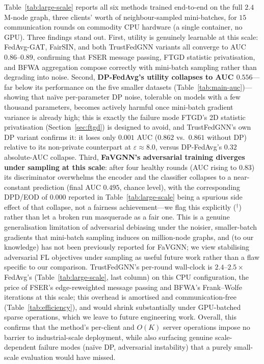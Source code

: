\documentclass[pdflatex,sn-mathphys-num]{sn-jnl}
\theoremstyle{thmstyleone}%
\theoremstyle{thmstyletwo}%
\theoremstyle{thmstylethree}%
\begin{document}
Table~\ref{tab:large-scale} reports all six methods trained end-to-end on the
full $2.4$M-node graph, three clients' worth of neighbour-sampled mini-batches,
for $15$ communication rounds on commodity CPU hardware (a single
container, no GPU). Three findings stand out. First, utility is genuinely
learnable at this scale: FedAvg-GAT, FairSIN, and both TrustFedGNN variants all
converge to AUC $0.86$--$0.89$, confirming that FSER message passing, FTGD
statistic privatisation, and BFWA aggregation compose correctly with
mini-batch sampling rather than degrading into noise. Second,
\textbf{DP-FedAvg's utility collapses to AUC $0.556$}---far below its
performance on the five smaller datasets (Table~\ref{tab:main-auc})---showing
that naïve per-parameter DP noise, tolerable on models with a few thousand
parameters, becomes actively harmful once mini-batch gradient variance is
already high; this is exactly the failure mode FTGD's 2D statistic
privatisation (Section~\ref{sec:ftgd}) is designed to avoid, and TrustFedGNN's
own DP variant confirms it: it loses only $0.001$ AUC ($0.862$ vs.\ $0.861$
without DP) relative to its non-private counterpart at $\varepsilon\approx 8.0$,
versus DP-FedAvg's $0.32$ absolute-AUC collapse. Third,
\textbf{FaVGNN's adversarial training diverges under sampling at this scale}:
after four healthy rounds (AUC rising to $0.83$) its discriminator overwhelms
the encoder and the classifier collapses to a near-constant prediction (final
AUC $0.495$, chance level), with the corresponding DPD/EOD of $0.000$ reported
in Table~\ref{tab:large-scale} being a spurious side effect of that collapse,
not a fairness achievement---we flag this explicitly ($^{\dagger}$) rather
than let a broken run masquerade as a fair one. This is a genuine
generalisation limitation of adversarial debiasing under the noisier,
smaller-batch gradients that mini-batch sampling induces on million-node
graphs, and (to our knowledge) has not been previously reported for FaVGNN;
we view stabilising adversarial FL objectives under sampling as useful future
work rather than a flaw specific to our comparison. TrustFedGNN's per-round
wall-clock is $2.4$--$2.5\times$ FedAvg's (Table~\ref{tab:large-scale},
last column) on this CPU configuration, the price of FSER's edge-reweighted
message passing and BFWA's Frank--Wolfe iterations at this scale; this
overhead is amortised and communication-free (Table~\ref{tab:efficiency}), and
would shrink substantially under GPU-batched sparse operations, which we
leave to future engineering work. Overall, this confirms that the method's
per-client and $O(K)$ server operations impose no barrier to industrial-scale
deployment, while also surfacing genuine scale-dependent failure modes
(naïve DP, adversarial instability) that a purely small-scale evaluation
would have missed.
\end{document}
